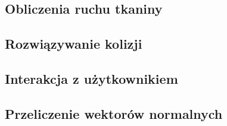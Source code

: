 			
		\subsection{Obliczenia ruchu tkaniny}
		\label{t:symulacja:dzialanie:ruch}
			
			
		\subsection{Rozwiązywanie kolizji}
		\label{t:symulacja:dzialanie:kolizje}
			
			
		\subsection{Interakcja z użytkownikiem}
		\label{t:symulacja:dzialanie:interakcja}
			
			
		\subsection{Przeliczenie wektorów normalnych}
		\label{t:symulacja:dzialanie:normalne}
			
	
	
